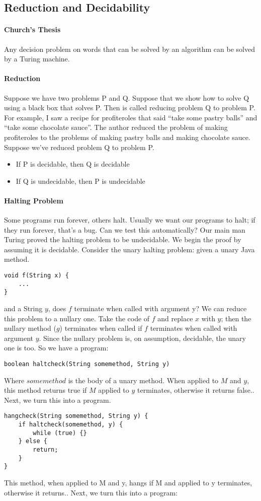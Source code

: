 \subsection{Reduction and Decidability}
\paragraph{Church's Thesis} Any decision problem on words that can be solved by an algorithm can be solved by a Turing machine.
\paragraph{Reduction}
Suppose we have two problems P and Q. Suppose that we show how to solve Q using a black box that solves P. Then is called reducing problem Q to problem P. 
For example, I saw a recipe for profiteroles that said “take some pastry balls” and “take some chocolate sauce”. The author reduced the problem of making profiteroles to the problems of making pastry balls and making chocolate sauce. 
Suppose we’ve reduced problem Q to problem P. 
\begin{itemize}
	\item If P is decidable, then Q is decidable
	\item If Q is undecidable, then P is undecidable
\end{itemize}
\paragraph{Halting Problem}
Some programs run forever, others halt. Usually we want our programs to halt; if they run forever, that’s a bug. Can we test this automatically? Our main man Turing proved the halting problem to be undecidable. We begin the proof by assuming it is decidable. Consider the unary halting problem: given a unary Java method.
\begin{verbatim}
void f(String x) {
    ...
}
\end{verbatim}
and a String $y$, does $f$ terminate when called with argument y? We can reduce this problem to a nullary one.
Take the code of $f$ and replace $x$ with $y$; then the nullary method ($g$) terminates when called if $f$ terminates when called with argument $y$. Since the nullary problem is, on assumption, decidable, the unary one is too. So we have a program:
\begin{verbatim}
boolean haltcheck(String somemethod, String y)
\end{verbatim}
Where $somemethod$ is the body of a unary method. When applied to $M$ and $y$, this method returns true if $M$ applied to $y$ terminates, otherwise it returns false.. Next, we turn this into a program.
\begin{verbatim}
hangcheck(String somemethod, String y) {
    if haltcheck(somemethod, y) {
        while (true) {}
    } else {
        return;
    }
}
\end{verbatim}
This method, when applied to M and y, hangs if M and applied to y terminates, otherwise it returns.. Next, we turn this into a program:

